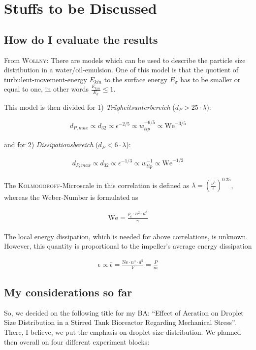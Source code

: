 \chapter{Stuffs to be Discussed}

\section{How do I evaluate the results}
From \textsc{Wollny}: There are models which can be used to describe the particle size distribution in a water/oil-emulsion. One of this model is that the quotient of turbulent-movement-energy $E_{kin}$ to the surface energy $E_\sigma$ has to be smaller or equal to one, in other words $\frac{E_{kin}}{E_\sigma} \leqslant 1$.

This model is then divided for 1) \textit{Tr\"agheitsunterbereich} ($d_P > 25 \cdot \lambda$):

\begin{align}
    d_{P, max} \propto d_{32} \propto \epsilon^{-2/5} \propto w_{tip}^{-6/5} \propto \text{We}^{-3/5}
\end{align}

and for 2) \textit{Dissipationsbereich} ($d_P < 6 \cdot \lambda$):

\begin{align}
    d_{P, max} \propto d_{32} \propto \epsilon^{-1/3} \propto w_{tip}^{-1} \propto \text{We}^{-1/2}
\end{align}

The \textsc{Kolmogoroff}-Microscale in this correlation is defined as $\lambda = \left( \frac{\nu^3}{\epsilon} \right)^{0.25}$, whereas the Weber-Number is formulated as

\begin{align}
    \text{We} = \frac{\rho_c \cdot n^2 \cdot d^3}{\gamma}
\end{align}

The local energy dissipation, which is needed for above correlations, is unknown. However, this quantity is proportional to the impeller's average energy dissipation

\begin{align}
    \epsilon \propto \overline{\epsilon} = \frac{\text{Ne} \cdot n^3 \cdot d^5}{V} = \frac{P}{m}
\end{align}


\section{My considerations so far}
So, we decided on the following title for my BA: “Effect of Aeration on Droplet Size Distribution in a Stirred Tank Bioreactor Regarding Mechanical Stress”. There, I believe, we put the emphasis on droplet size distribution. We planned then overall on four different experiment blocks:

